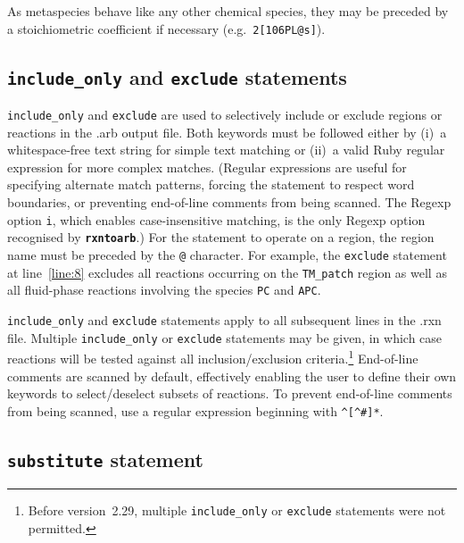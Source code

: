 \documentclass[fontsize=12pt,
               captions=abovetable,
               numbers=noenddot,
              ]{scrartcl}
\newcommand{\eg}[1][\ ]{e.g.#1}
\newcommand{\rxntoarb}{\texttt{\textbf{rxntoarb}}}
\newcommand{\syntax}[2]{\textcolor{#1}{\texttt{#2}}}
\newcommand{\lnum}[1]{line~\ref{line:#1}}
\begin{document}
As metaspecies behave like any other chemical species, they may be preceded by a stoichiometric coefficient if necessary (\eg \texttt{\syntax{string}{2}\syntax{statement}{[}\syntax{string}{106}PL\syntax{special}{@s}\syntax{statement}{]}}).

\subsection{\syntax{statement}{include\_only} and \syntax{statement}{exclude} statements}

\syntax{statement}{include\_only} and \syntax{statement}{exclude} are used to selectively include or exclude regions or reactions in the .arb output file. Both keywords must be followed either by (i)~a whitespace-free text string for simple text matching or (ii)~a valid Ruby regular expression for more complex matches. (Regular expressions are useful for specifying alternate match patterns, forcing the statement to respect word boundaries, or preventing end-of-line comments from being scanned. The Regexp option \syntax{special}{i}, which enables case-insensitive matching, is the only Regexp option recognised by \rxntoarb.) For the statement to operate on a region, the region name must be preceded by the \syntax{special}{@} character. For example, the \syntax{statement}{exclude} statement at \lnum{8} excludes all reactions occurring on the \texttt{TM\_patch} region as well as all fluid-phase reactions involving the species \texttt{PC} and \texttt{APC}.

\syntax{statement}{include\_only} and \syntax{statement}{exclude} statements apply to all subsequent lines in the .rxn file. Multiple \syntax{statement}{include\_only} or \syntax{statement}{exclude} statements may be given, in which case reactions will be tested against all inclusion\slash{}exclusion criteria.\footnote{Before version~2.29, multiple \syntax{statement}{include\_only} or \syntax{statement}{exclude} statements were not permitted.} End-of-line comments are scanned by default, effectively enabling the user to define their own keywords to select\slash{}deselect subsets of reactions. To prevent end-of-line comments from being scanned, use a regular expression beginning with \texttt{\^{}[\^{}\#]*}.

\subsection{\syntax{statement}{substitute} statement}
\end{document}
